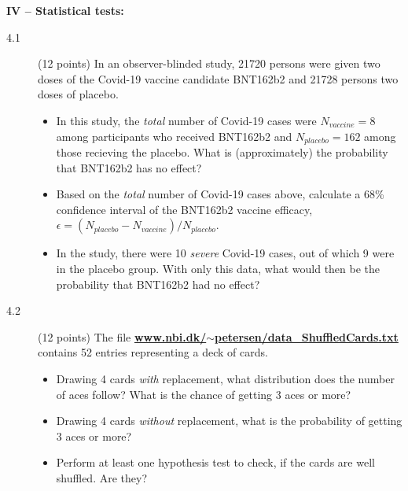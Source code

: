 \documentclass[11pt]{article}
\begin{document}
\noindent
{\bf IV -- Statistical tests:}
\begin{description}
\item[4.1] (12 points)
  In an observer-blinded study, 21720 persons were given two doses of the Covid-19 vaccine candidate BNT162b2 and 21728 persons two doses of placebo.
  \vspace*{-1ex}
  \begin{itemize}
    \item In this study, the \emph{total} number of Covid-19 cases were $N_{vaccine} = 8$ among participants who received BNT162b2 and
      $N_{placebo} = 162$ among those recieving the placebo. What is (approximately) the probability that BNT162b2 has no effect?
    \item Based on the \emph{total} number of Covid-19 cases above, calculate a 68\% confidence interval of the BNT162b2 vaccine efficacy,
      $\epsilon = (N_{placebo} - N_{vaccine}) / N_{placebo}$.
    \item In the study, there were 10 \emph{severe} Covid-19 cases, out of which 9 were in the placebo group. With only this data,
      what would then be the probability that BNT162b2 had no effect?
  \end{itemize}
%
\item[4.2] (12 points)
  The file \href{http://www.nbi.dk/~petersen/data\_ShuffledCards.txt}{\bf www.nbi.dk/$\sim$petersen/data\_ShuffledCards.txt} contains
  52 entries representing a deck of cards.
  \vspace*{-1ex}
  \begin{itemize}
    \item Drawing 4 cards \emph{with} replacement, what distribution does the number of aces follow?
      What is the chance of getting 3 aces or more?
    \item Drawing 4 cards \emph{without} replacement, what is the probability of getting 3 aces or more?
    \item Perform at least one hypothesis test to check, if the cards are well shuffled. Are they?
  \end{itemize}
\end{description}



\end{document}
